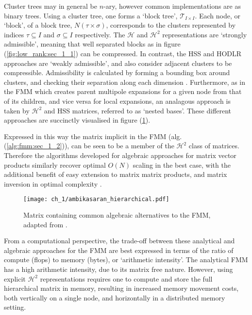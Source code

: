 Cluster trees may in general be $n$-ary, however common implementations are as binary trees. Using a cluster tree, one forms a `block tree', $\mathcal{T}_{I \times I}$. Each node, or `block', of a block tree, $N(\tau \times \sigma)$, corresponds to the clusters represented by indices $\tau \subseteq I$ and $\sigma \subseteq I$ respectively. The $\mathcal{H}$ and $\mathcal{H}^2$ representations are `strongly admissible', meaning that well separated blocks as in figure (\ref{fig:low_rank:sec_1_1}) can be compressed. In contrast, the HSS and HODLR approaches are `weakly admissible', and also consider adjacent clusters to be compressible. Admissibility is calculated by forming a bounding box around clusters, and checking their separation along each dimension \cite{borm2003introduction}. Furthermore, as in the \gls{FMM} which creates parent multipole expansions for a given node from that of its children, and vice versa for local expansions, an analagous approach is taken by $\mathcal{H}^2$ and HSS matrices, referred to as `nested bases'. These different approaches are succinctly visualised in figure (\ref{fig:ambikasaran_hierarchical:sec_1_2}). 

Expressed in this way the matrix implicit in the FMM (alg. (\ref{alg:fmm:sec_1_2})), can be seen to be a member of the $\mathcal{H}^2$ class of matrices. Therefore the algorithms developed for algebraic approaches for matrix vector products similarly recover optimal $O(N)$ scaling in the best case, with the additional benefit of easy extension to matrix matrix products, and matrix inversion in optimal complexity \cite{borm2003introduction}.

\begin{figure}
    \centering
    \texttt{[image: ch\_1/ambikasaran\_hierarchical.pdf]}
    \caption{Matrix containing common algebraic alternatives to the FMM, adapted from \cite{ambikasaran2013fast}.}
    \label{fig:ambikasaran_hierarchical:sec_1_2}
\end{figure}

From a computational perspective, the trade-off between these analytical and algebraic approaches for the FMM are best expressed in terms of the ratio of compute (\gls{flops}) to memory (bytes), or `arithmetic intensity'. The analytical \gls{FMM} has a high arithmetic intensity, due to its matrix free nature. However, using explicit $\mathcal{H}^2$ representations requires one to compute and store the full hierarchical matrix in memory, resulting in increased memory movement costs, both vertically on a single node, and horizontally in a distributed memory setting. 

